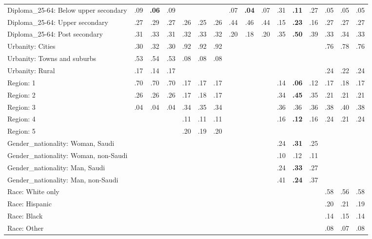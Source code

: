 \begin{tabular}[t]{lccccccccccccccc}
\addlinespace
Diploma\_25-64: Below upper secondary & .09 & \textbf{.06} & .09 &  &  &  & .07 & \textbf{.04} & .07 & .31 & \textbf{.11} & .27 & .05 & .05 & .05\\
Diploma\_25-64: Upper secondary & .27 & .29 & .27 & .26 & .25 & .26 & .44 & .46 & .44 & .15 & \textbf{.23} & .16 & .27 & .27 & .27\\
Diploma\_25-64: Post secondary & .31 & .33 & .31 & .32 & .33 & .32 & .20 & .18 & .20 & .35 & \textbf{.50} & .39 & .33 & .34 & .33\\
\addlinespace
Urbanity: Cities & .30 & .32 & .30 & .92 & .92 & .92 &  &  &  &  &  &  & .76 & .78 & .76\\
Urbanity: Towns and suburbs & .53 & .54 & .53 & .08 & .08 & .08 &  &  &  &  &  &  &  &  & \\
Urbanity: Rural & .17 & .14 & .17 &  &  &  &  &  &  &  &  &  & .24 & .22 & .24\\
\addlinespace
Region: 1 & .70 & .70 & .70 & .17 & .17 & .17 &  &  &  & .14 & \textbf{.06} & .12 & .17 & .18 & .17\\
Region: 2 & .26 & .26 & .26 & .17 & .18 & .17 &  &  &  & .34 & \textbf{.45} & .35 & .21 & .21 & .21\\
Region: 3 & .04 & .04 & .04 & .34 & .35 & .34 &  &  &  & .36 & .36 & .36 & .38 & .40 & .38\\
Region: 4 &  &  &  & .11 & .11 & .11 &  &  &  & .16 & \textbf{.12} & .16 & .24 & .21 & .24\\
Region: 5 &  &  &  & .20 & .19 & .20 &  &  &  &  &  &  &  &  & \\
\addlinespace
Gender\_nationality: Woman, Saudi &  &  &  &  &  &  &  &  &  & .24 & \textbf{.31} & .25 &  &  & \\
Gender\_nationality: Woman, non-Saudi &  &  &  &  &  &  &  &  &  & .10 & .12 & .11 &  &  & \\
Gender\_nationality: Man, Saudi &  &  &  &  &  &  &  &  &  & .24 & \textbf{.33} & .27 &  &  & \\
Gender\_nationality: Man, non-Saudi &  &  &  &  &  &  &  &  &  & .41 & \textbf{.24} & .37 &  &  & \\
\addlinespace
Race: White only &  &  &  &  &  &  &  &  &  &  &  &  & .58 & .56 & .58\\
Race: Hispanic &  &  &  &  &  &  &  &  &  &  &  &  & .20 & .21 & .19\\
Race: Black &  &  &  &  &  &  &  &  &  &  &  &  & .14 & .15 & .14\\
Race: Other &  &  &  &  &  &  &  &  &  &  &  &  & .08 & .07 & .08\\
\bottomrule
\end{tabular}